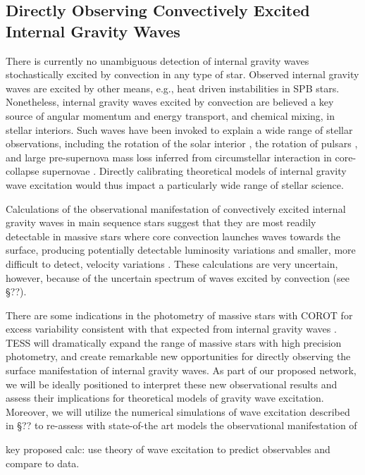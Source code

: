 \color{blue}
\subsection{Directly Observing Convectively Excited Internal Gravity Waves}

There is currently no unambiguous detection of  internal gravity waves stochastically excited by convection in any type of star.  Observed internal gravity waves  are excited by other means, e.g., heat driven instabilities in SPB stars. Nonetheless, internal gravity waves excited by convection are believed a key source of angular momentum and energy transport, and chemical mixing, in stellar interiors.   Such waves have been invoked to explain a wide range of stellar observations, including the rotation of the solar interior \citep{kumar1999}, the rotation of pulsars \citep{fuller2015}, and large pre-supernova mass loss inferred from circumstellar interaction in core-collapse supernovae \citep{qs2012}.   Directly calibrating theoretical models of internal gravity wave excitation would thus impact a particularly wide range of stellar science.

Calculations of the observational manifestation of convectively excited internal gravity waves in main sequence stars suggest that they are most readily detectable in massive stars where core convection launches waves towards the surface, producing potentially detectable luminosity variations and smaller, more difficult to detect, velocity variations \citep{samadi2010,shiode2013}.   These calculations are very uncertain, however, because of the uncertain spectrum of waves excited by convection (see \S ??).

There are some indications in the photometry of massive stars with COROT for excess variability consistent with that expected from internal gravity waves \citep{aerts2015}.   TESS will dramatically expand the range of massive stars with high precision photometry, and create remarkable new opportunities for directly observing the surface manifestation of internal gravity waves.   
As part of our proposed network, we will be ideally positioned to interpret these new observational results and assess their implications for theoretical models of gravity wave excitation.   Moreover, we will utilize the numerical simulations of wave excitation described in \S ?? to re-assess with state-of-the art models the observational manifestation of 

key proposed calc:   use theory of wave excitation to predict observables and compare to data.

